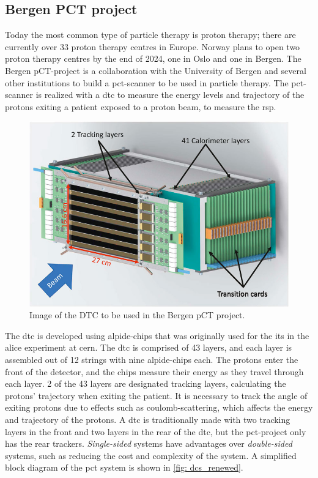 \documentclass[main.tex]{subfiles}
\begin{document}
\subsection{Bergen PCT project}
Today the most common type of particle therapy is proton therapy; there are currently over 33 proton therapy centres in Europe. Norway plans to open two proton therapy centres by the end of 2024, one in Oslo and one in Bergen. The Bergen pCT-project is a collaboration with the University of Bergen and several other institutions to build a \gls{pct}-scanner to be used in particle therapy. The \gls{pct}-scanner is realized with a \gls{dtc} to measure the energy levels and trajectory of the protons exiting a patient exposed to a proton beam, to measure the \gls{rsp}.

\begin{figure}[!ht]
    \centering
    \includegraphics[scale = 0.5]{images/dtc.jpg}
    \caption{Image of the DTC to be used in the Bergen pCT project\cite{pct_project}.}
    \label{fig: dtc_intro}
\end{figure}
\FloatBarrier

The \gls{dtc} is developed using \gls{alpide}-chips that was originally used for the \gls{its} in the \acrshort{alice} experiment at \acrshort{cern}. The \gls{dtc} is comprised of 43 layers, and each layer is assembled out of 12 strings with nine \gls{alpide}-chips each. The protons enter the front of the detector, and the chips measure their energy as they travel through each layer. 2 of the 43 layers are designated tracking layers, calculating the protons' trajectory when exiting the patient. It is necessary to track the angle of exiting protons due to effects such as coulomb-scattering, which affects the energy and trajectory of the protons. A \gls{dtc} is traditionally made with two tracking layers in the front and two layers in the rear of the \gls{dtc}, but the \gls{pct}-project only has the rear trackers. \textit{Single-sided} systems have advantages over \textit{double-sided} systems, such as reducing the cost and complexity of the system. A simplified block diagram of the \gls{pct} system is shown in \autoref{fig: dcs_renewed}.
\end{document}
